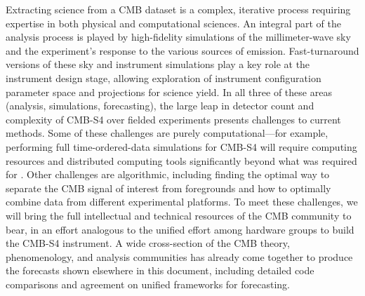 Extracting science from a CMB dataset is a complex, iterative process requiring expertise in both physical and computational sciences. An integral part of the analysis process is played by high-fidelity simulations of the millimeter-wave sky and the experiment's response to the various sources of emission. Fast-turnaround versions of these sky and instrument simulations play a key role at the instrument design stage, allowing exploration of instrument configuration parameter space and projections for science yield. In all three of these areas (analysis, simulations, forecasting), the large leap in detector count and complexity of CMB-S4 over fielded experiments presents challenges to current methods. Some of these challenges are purely computational---for example, performing full time-ordered-data simulations for CMB-S4 will require computing resources and distributed computing tools significantly beyond what was required for \planck. Other challenges are algorithmic, including finding the optimal way to separate the CMB signal of interest from foregrounds and how to optimally combine data from different experimental platforms. To meet these challenges, we will bring the full intellectual and technical resources of the CMB community to bear, in an effort analogous to the unified effort among hardware groups to build the CMB-S4 instrument. A wide cross-section of the CMB theory, phenomenology, and analysis communities has already come together to produce the forecasts shown elsewhere in this document, including detailed code comparisons and agreement on unified frameworks for forecasting.
